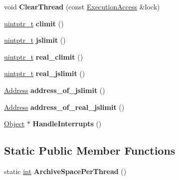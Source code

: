 \begin{DoxyCompactItemize}
void {\bfseries Clear\+Thread} (const \mbox{\hyperlink{classv8_1_1internal_1_1ExecutionAccess}{Execution\+Access}} \&lock)
\item 
\mbox{\label{classv8_1_1internal_1_1StackGuard_a3fc7c4f7b03f04254e545670a0708e9b}} 
\mbox{\hyperlink{classuintptr__t}{uintptr\+\_\+t}} {\bfseries climit} ()
\item 
\mbox{\label{classv8_1_1internal_1_1StackGuard_a4bea1f2e4968f6610c790bb459caa506}} 
\mbox{\hyperlink{classuintptr__t}{uintptr\+\_\+t}} {\bfseries jslimit} ()
\item 
\mbox{\label{classv8_1_1internal_1_1StackGuard_a42e4c0136070320961e60b3e648b1776}} 
\mbox{\hyperlink{classuintptr__t}{uintptr\+\_\+t}} {\bfseries real\+\_\+climit} ()
\item 
\mbox{\label{classv8_1_1internal_1_1StackGuard_a8e958b6a54c5b3544f348b1b0ce15a89}} 
\mbox{\hyperlink{classuintptr__t}{uintptr\+\_\+t}} {\bfseries real\+\_\+jslimit} ()
\item 
\mbox{\label{classv8_1_1internal_1_1StackGuard_a64bf18f10b1fef7d8191e4f8a2ab2bc1}} 
\mbox{\hyperlink{classuintptr__t}{Address}} {\bfseries address\+\_\+of\+\_\+jslimit} ()
\item 
\mbox{\label{classv8_1_1internal_1_1StackGuard_ac386b01202223f24137fb4787ac46e69}} 
\mbox{\hyperlink{classuintptr__t}{Address}} {\bfseries address\+\_\+of\+\_\+real\+\_\+jslimit} ()
\item 
\mbox{\label{classv8_1_1internal_1_1StackGuard_a7b36217b84abfba7245753fdc1770fdd}} 
\mbox{\hyperlink{classv8_1_1internal_1_1Object}{Object}} $\ast$ {\bfseries Handle\+Interrupts} ()
\end{DoxyCompactItemize}
\subsection*{Static Public Member Functions}
\begin{DoxyCompactItemize}
\item 
\mbox{\label{classv8_1_1internal_1_1StackGuard_aca52d15703dd748210cc05932ad6ab8f}} 
static \mbox{\hyperlink{classint}{int}} {\bfseries Archive\+Space\+Per\+Thread} ()
\end{DoxyCompactItemize}
